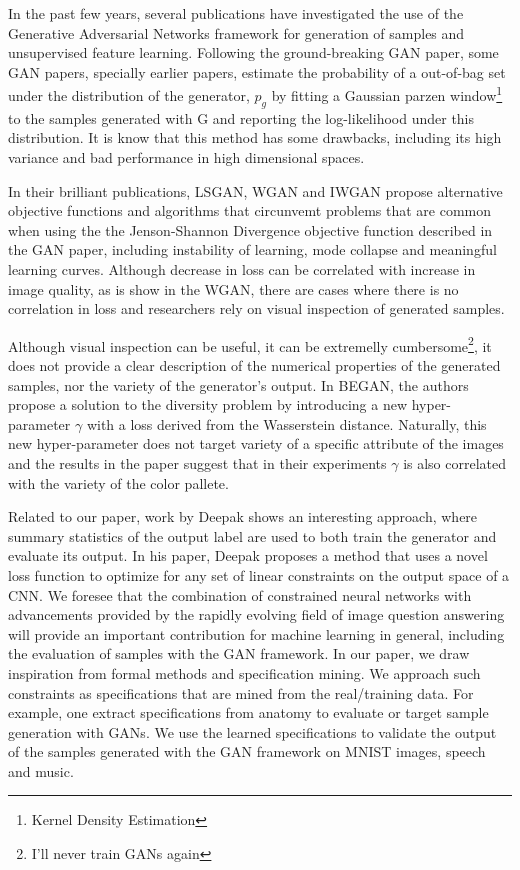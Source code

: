 In the past few years, several publications have investigated the use of the
Generative Adversarial Networks framework for generation of samples and
unsupervised feature learning. Following the ground-breaking GAN paper, some GAN
papers, specially earlier papers, estimate the probability of a
out-of-bag set under the distribution of the generator, $p_g$ by fitting a
Gaussian parzen window\footnote{Kernel Density Estimation} to the samples generated 
with G and reporting the log-likelihood under this distribution. It is know that
this method has some drawbacks, including its high variance and bad performance
in high dimensional spaces. 

In their brilliant publications, LSGAN, WGAN and IWGAN propose alternative
objective functions and algorithms that circunvemt problems that are common when using the
the Jenson-Shannon Divergence objective function described in the GAN paper, including instability of
learning, mode collapse and meaningful learning curves. Although decrease in
loss can be correlated with increase in image quality, as is show in the WGAN,
there are cases where there is no correlation in loss and researchers rely on
visual inspection of generated samples.

Although visual inspection can be useful, it can be extremelly
cumbersome\footnote{I'll never train GANs again}, it does not provide a clear
description of the numerical properties of the generated samples, nor the
variety of the generator's output. In BEGAN, the authors propose a solution to
the diversity problem by introducing a new hyper-parameter $\gamma$ with a loss
derived from the Wasserstein distance. Naturally, this new hyper-parameter does
not target variety of a specific attribute of the images and the results in the
paper suggest that in their experiments $\gamma$ is also correlated with the variety
of the color pallete.  

Related to our paper, work by Deepak shows an interesting approach, where summary 
statistics of the output label are used to both train the generator and evaluate its output. 
In his paper, Deepak proposes a method that uses a novel loss function to
optimize for any set of linear constraints on the output space of a CNN. We foresee that the
combination of constrained neural networks with advancements provided by the 
rapidly evolving field of image question answering will provide an important
contribution for machine learning in general, including the evaluation of
samples with the GAN framework. 
In our paper, we draw inspiration from formal methods and specification mining.
We approach such constraints as specifications that are mined from the
real/training data. For example, one extract specifications from anatomy to
evaluate or target sample generation with GANs. We use the learned specifications 
to validate the output of the samples generated with the GAN framework on MNIST
images, speech and music.

